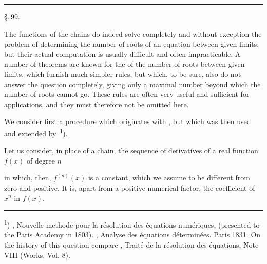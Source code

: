 
\begin{center}


\rule{0.3\linewidth}{0.4pt}

\S.\,99.

\end{center}

The functions of the  chains do indeed solve completely and without exception the problem of determining the number of roots of an equation between given limits; but their actual computation is usually difficult and often impracticable. A number of theorems are known for the  of the number of roots between given limits, which furnish much simpler rules, but which, to be sure, also do not answer the question completely, giving only a maximal number beyond which the number of roots cannot go. These rules are often very useful and sufficient for applications, and they must therefore not be omitted here.

We consider first a procedure which originates with , but which was then used and extended by \,\textsuperscript{1}).

Let us consider, in place of a  chain, the sequence of derivatives of a real function $f(x)$ of degree $n$


in which, then, $f^{(n)}(x)$ is a constant, which we assume to be different from zero and positive. It is, apart from a positive numerical factor, the coefficient of $x^n$ in $f(x)$.

\noindent\rule{0.25\linewidth}{0.4pt}

\footnotesize
\textsuperscript{1}) , Nouvelle methode pour la r\'esolution des \'equations num\'eriques, (presented to the Paris Academy in 1803). , Analyse des \'equations d\'etermin\'ees. Paris 1831. On the history of this question compare , Trait\'e de la r\'esolution des \'equations, Note VIII (Works, Vol. 8).
\normalsize
